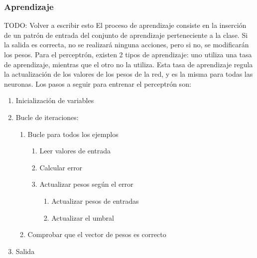 \subsubsection{Aprendizaje}
TODO: Volver a escribir esto
El proceso de aprendizaje consiste en la inserción de un patrón de entrada del conjunto de aprendizaje perteneciente a la clase. Si la salida es correcta, no se realizará ninguna acciones, pero si no, se modificarán los pesos.
Para el perceptrón, existen 2 tipos de aprendizaje: uno utiliza una tasa de aprendizaje, mientras que el otro no la utiliza. Esta tasa de aprendizaje regula la actualización de los valores de los pesos de la red, y es la misma para todas las neuronas. Los pasos a seguir para entrenar el perceptrón son:
\begin{enumerate}
\item Inicialización de variables
\item Bucle de iteraciones:
\begin{enumerate}
\item Bucle para todos los ejemplos
\begin{enumerate}
\item Leer valores de entrada
\item Calcular error
\item Actualizar pesos según el error
\begin{enumerate}
\item Actualizar pesos de entradas
\item Actualizar el umbral
\end{enumerate}
\end{enumerate}
\item Comprobar que el vector de pesos es correcto
\end{enumerate}
\item Salida
\end{enumerate}

